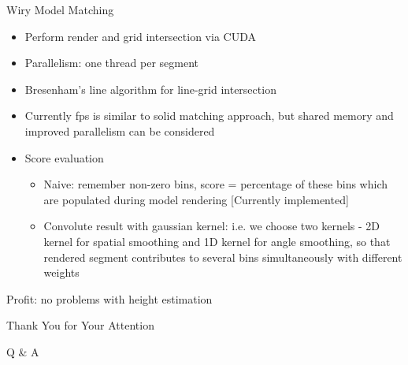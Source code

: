 \documentclass{beamer}
\begin{document}
\begin{frame}[t, fragile]{Wiry Model Matching}
\begin{itemize}
\item Perform render and grid intersection via CUDA
\item Parallelism: one thread per segment
\item Bresenham's line algorithm for line-grid intersection
\item Currently fps is similar to solid matching approach, but shared memory and improved parallelism can be considered
\item Score evaluation
\begin{itemize}
\item Naive: remember non-zero bins, score = percentage of these bins which are populated during model rendering [Currently implemented]
\item Convolute result with gaussian kernel: i.e. we choose two kernels - 2D kernel for spatial smoothing and 1D kernel for angle smoothing, so that rendered segment contributes to several bins simultaneously with different weights
\end{itemize}
\end{itemize}
Profit: no problems with height estimation
\end{frame}


\begin{frame}[fragile]{Thank You for Your Attention}

\begin{center}
\Huge Q \& A
\end{center}
\end{frame}
\end{document}
